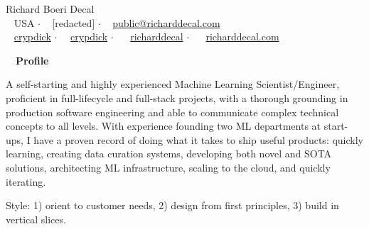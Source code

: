 \documentclass[a4paper,12pt]{article}
\newcommand{\resheading}[1]{{\hspace{-9pt} \colorbox{mygrey}{\begin{minipage}{\textwidth}{\textmd{~~\large \textbf{#1} \vphantom{p\^{E}}}}\end{minipage}}\vspace{6pt}} }
\begin{document}
    \begin{center}
    {\Huge Richard Boeri Decal}
        \\
        {\small \faMapMarker~ USA $\cdot$ \faPhone~ [redacted] $\cdot$ \faEnvelope~ \href{mailto:public@richarddecal.com}{public@richarddecal.com}  \\ \faGithubAlt~ \href{https://github.com/crypdick}{crypdick} $\cdot$~\faStackOverflow~  \href{https://stackoverflow.com/users/4212158/crypdick}{crypdick} $\cdot$ ~\faLinkedin~ \href{https://www.linkedin.com/in/richarddecal/}{richarddecal}  $\cdot$ ~\faHome~  \href{https://www.richarddecal.com}{richarddecal.com}}
    \end{center}

    \resheading{Profile}

    A self-starting and highly experienced Machine Learning Scientist/Engineer, proficient in full-lifecycle and 
    full-stack projects, with a thorough grounding in production software engineering and able to communicate
    complex technical concepts to all levels.
    With experience founding two ML departments at start-ups, I have a proven record of doing what 
    it takes to ship useful products: quickly learning, creating data curation systems, developing both 
    novel and SOTA solutions, architecting ML infrastructure, scaling to the cloud, and quickly iterating. 
    

    \vspace{0.5em} %

    Style: 1) orient to customer needs, 2) design from first principles, 3) build in vertical slices.\\
\end{document}
